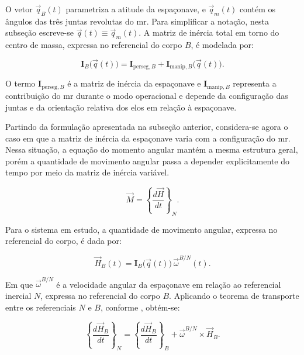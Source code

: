 O vetor $\vec{q}_B(t)$ parametriza a atitude da espaçonave, e $\vec{q}_m(t)$ contém os ângulos das três juntas revolutas do \gls{mr}.
Para simplificar a notação, nesta subseção escreve-se $\vec{q}(t)\equiv\vec{q}_m(t)$.
A matriz de inércia total em torno do centro de massa, expressa no referencial do
corpo $B$, é modelada por:

\begin{equation}
\mathbf{I}_B\big(\vec{q}(t)\big)
=
\mathbf{I}_{\text{perseg},B}
+
\mathbf{I}_{\text{manip},B}\big(\vec{q}(t)\big).
\label{eq_inercia_total}
\end{equation}

O termo $\mathbf{I}_{\text{perseg},B}$ é a matriz de inércia da espaçonave e
$\mathbf{I}_{\text{manip},B}$ representa a contribuição do \gls{mr} durante o modo operacional e depende da configuração das juntas e da orientação relativa dos elos em relação à espaçonave.

Partindo da formulação apresentada na subseção anterior, considera-se agora o caso em que a matriz de inércia da espaçonave varia com a configuração do \gls{mr}. Nessa situação, a equação do momento angular mantém a mesma estrutura geral, porém a quantidade de movimento angular passa a depender explicitamente do tempo por meio da matriz de inércia variável.

\begin{equation}
\vec{M}
=
\left\{ \frac{d\vec{H}}{dt} \right\}_{N}.
\label{eq_eq_momento_angular}
\end{equation}

Para o sistema em estudo, a quantidade de movimento angular, expressa no referencial do corpo, é dada por:

\begin{equation}
\vec{H}_B(t)
=
\mathbf{I}_B\big(\vec{q}(t)\big)\,
\vec{\omega}^{B/N}(t).
\label{eq_H_def}
\end{equation}

Em que $\vec{\omega}^{B/N}$ é a velocidade angular da espaçonave em relação ao referencial inercial $N$, expressa no referencial do corpo $B$.
Aplicando o teorema de transporte entre os referenciais $N$ e $B$, conforme \cite{wie2008space}, obtém-se:

\begin{equation}
\left\{ \frac{d\vec{H}_B}{dt} \right\}_{N}
=
\left\{ \frac{d\vec{H}_B}{dt} \right\}_{B}
+
\vec{\omega}^{B/N} \times \vec{H}_B.
\label{eq_teorema_transporte_H}
\end{equation}

